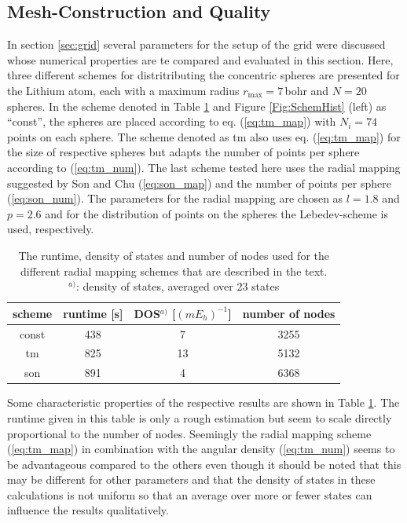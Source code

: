 \subsection{Mesh-Construction and Quality}
\label{sec:NumConve}
In section \ref{sec:grid} several parameters for the setup of the grid were discussed whose numerical properties are te compared and evaluated in this section.
Here, three different schemes for distritributing the concentric spheres are presented for the Lithium atom, each with a maximum radius $r_\text{max}=7\,$bohr and $N=20$ spheres.
In the scheme denoted in Table \ref{tab:RadScheme} and Figure \ref{Fig:SchemHist} (left) as ``const'', the spheres are placed according to eq. (\ref{eq:tm_map}) with $N_i=74$ points on each sphere.
The scheme denoted as tm also uses eq. (\ref{eq:tm_map}) for the size of respective spheres but adapts the number of points per sphere according to (\ref{eq:tm_num}).
The last scheme tested here uses the radial mapping suggested by Son and Chu \cite{Son_Chu0} (\ref{eq:son_map}) and the number of points per sphere (\ref{eq:son_num}).
The parameters for the radial mapping are chosen as $l=1.8$ and $p=2.6$ and for the distribution of points on the spheres the Lebedev-scheme \cite{lebedev} is used, respectively.
\begin{table}
\begin{tabular}{|c|c|c|c|}
\hline
scheme & runtime [s] & DOS$^{a)}$ [$(m E_h)^{-1}$] & number of nodes\\
\hline
const   &  438   &    7    &   3255 \\
tm      &  825   &    13   &   5132 \\
son     &  891   &    4    &   6368 \\
\hline
\end{tabular}
\caption{The runtime, density of states and number of nodes used for the different radial mapping schemes that are described in the text.\\
$^{a)}$: density of states, averaged over 23 states}
\label{tab:RadScheme}
\end{table}
Some characteristic properties of the respective results are shown in Table \ref{tab:RadScheme}.
The runtime given in this table is only a rough estimation but seem to scale directly proportional to the number of nodes.
Seemingly the radial mapping scheme (\ref{eq:tm_map}) in combination with the angular density (\ref{eq:tm_num}) seems to be advantageous compared to the others even though it should be noted that this may be different for other parameters and that the density of states in these calculations is not uniform so that an average over more or fewer states can influence the results qualitatively.
